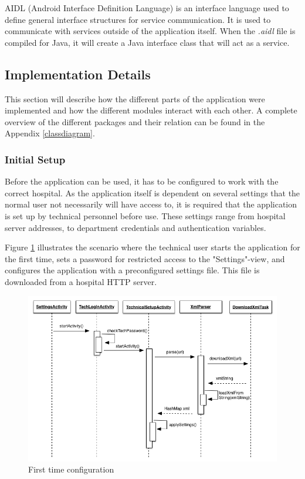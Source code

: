 AIDL (Android Interface Definition Language) is an interface language used to define general interface structures for service communication. It is used to communicate with services outside of the application itself. When the \emph{.aidl} file is compiled for Java, it will create a Java interface class that will act as a service.

\subsection{Implementation Details}

This section will describe how the different parts of the application were implemented and how the different modules interact with each other. A complete overview of the different packages and their relation can be found in the Appendix \ref{classdiagram}.

\subsubsection{Initial Setup}

Before the application can be used, it has to be configured to work with the correct hospital. As the application itself is dependent on several settings that the normal user not necessarily will have access to, it is required that the application is set up by technical personnel before use. These settings range from hospital server addresses, to department credentials and authentication variables.

Figure \ref{fig:config} illustrates the scenario where the technical user starts the application for the first time, sets a password for restricted access to the "Settings"-view, and configures the application with a preconfigured settings file. This file is downloaded from a hospital HTTP server.  

\begin{figure}[H]
\centering
\includegraphics[scale=0.5]{img/sequence_config.png}
\caption{First time configuration}
\label{fig:config}
\end{figure}

